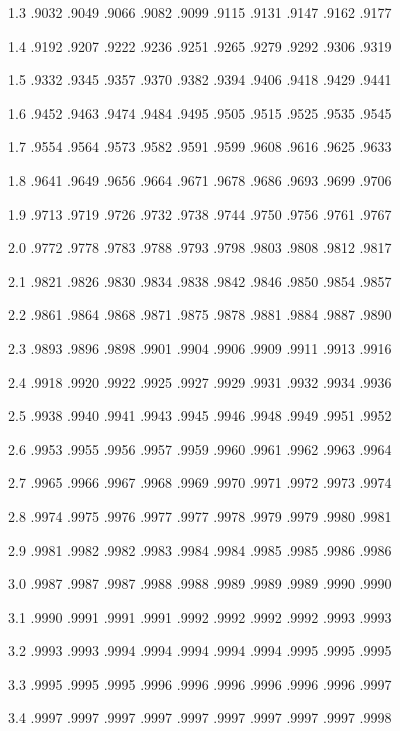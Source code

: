 \documentclass[12pt,fleqn]{article}\usepackage{../common}
\begin{document}
1.3 .9032 .9049 .9066 .9082 .9099 .9115 .9131 .9147 .9162 .9177

1.4 .9192 .9207 .9222 .9236 .9251 .9265 .9279 .9292 .9306 .9319

1.5 .9332 .9345 .9357 .9370 .9382 .9394 .9406 .9418 .9429 .9441

1.6 .9452 .9463 .9474 .9484 .9495 .9505 .9515 .9525 .9535 .9545

1.7 .9554 .9564 .9573 .9582 .9591 .9599 .9608 .9616 .9625 .9633

1.8 .9641 .9649 .9656 .9664 .9671 .9678 .9686 .9693 .9699 .9706

1.9 .9713 .9719 .9726 .9732 .9738 .9744 .9750 .9756 .9761 .9767

2.0 .9772 .9778 .9783 .9788 .9793 .9798 .9803 .9808 .9812 .9817

2.1 .9821 .9826 .9830 .9834 .9838 .9842 .9846 .9850 .9854 .9857

2.2 .9861 .9864 .9868 .9871 .9875 .9878 .9881 .9884 .9887 .9890

2.3 .9893 .9896 .9898 .9901 .9904 .9906 .9909 .9911 .9913 .9916

2.4 .9918 .9920 .9922 .9925 .9927 .9929 .9931 .9932 .9934 .9936

2.5 .9938 .9940 .9941 .9943 .9945 .9946 .9948 .9949 .9951 .9952

2.6 .9953 .9955 .9956 .9957 .9959 .9960 .9961 .9962 .9963 .9964

2.7 .9965 .9966 .9967 .9968 .9969 .9970 .9971 .9972 .9973 .9974

2.8 .9974 .9975 .9976 .9977 .9977 .9978 .9979 .9979 .9980 .9981

2.9 .9981 .9982 .9982 .9983 .9984 .9984 .9985 .9985 .9986 .9986

3.0 .9987 .9987 .9987 .9988 .9988 .9989 .9989 .9989 .9990 .9990

3.1 .9990 .9991 .9991 .9991 .9992 .9992 .9992 .9992 .9993 .9993

3.2 .9993 .9993 .9994 .9994 .9994 .9994 .9994 .9995 .9995 .9995

3.3 .9995 .9995 .9995 .9996 .9996 .9996 .9996 .9996 .9996 .9997

3.4 .9997 .9997 .9997 .9997 .9997 .9997 .9997 .9997 .9997 .9998
\end{document}
